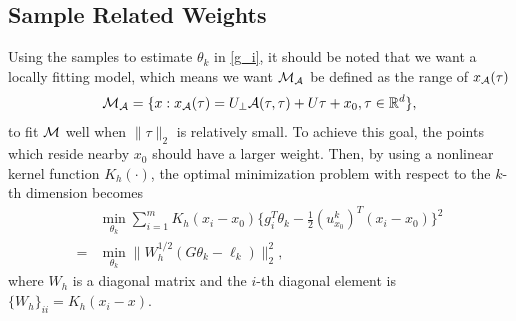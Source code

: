 \documentclass{article}
\theoremstyle{remark}
\begin{document}
\subsection{Sample Related Weights}
Using the samples to estimate $\theta_k$ in \eqref{g_i}, it should be noted that we want a locally fitting model, which means we want ${\cal M_A}$ be defined as the range of $x_{\cal A}(\tau)$
\begin{equation}\label{M_A}
{\cal M_A} = \{x:x_{\cal A}(\tau) = U_{\perp} {\cal A} (\tau,\tau) + U \tau +x_0,\tau\in {\mathbb R}^d\},
\end{equation}
to fit $\cal M$ well when $\|\tau\|_2$ is relatively small. To achieve this goal, the points which reside nearby $x_0$ should have a larger weight.
Then, by using a nonlinear kernel function $K_h(\cdot)$, the optimal minimization problem with respect to the $k$-th dimension becomes
\begin{equation}\label{optimal}
\begin{aligned}
  &\min_{\theta_k} \sum_{i=1}^m K_h(x_i-x_0)\{ g_i^T \theta_k  - \frac{1}{2} {(u^k_{x_0})}^T (x_i -x_0)\}^2\\
= & \min_{\theta_k} \|W_h^{1/2}(G \theta_k-\ell_k) \|_2^2,
\end{aligned}
\end{equation}
where $W_h$ is a diagonal matrix and the $i$-th diagonal element is $\{{W_h}\}_{ii} = K_h(x_i-x)$. %
\end{document}
